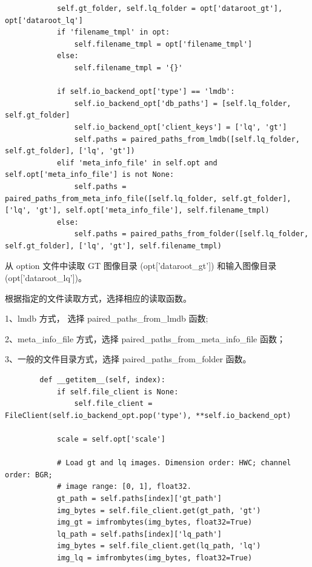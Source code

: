 \documentclass[../main.tex]{subfiles}
\begin{document}
\begin{verbatim}
            self.gt_folder, self.lq_folder = opt['dataroot_gt'], opt['dataroot_lq']
            if 'filename_tmpl' in opt:
                self.filename_tmpl = opt['filename_tmpl']
            else:
                self.filename_tmpl = '{}'

            if self.io_backend_opt['type'] == 'lmdb':
                self.io_backend_opt['db_paths'] = [self.lq_folder, self.gt_folder]
                self.io_backend_opt['client_keys'] = ['lq', 'gt']
                self.paths = paired_paths_from_lmdb([self.lq_folder, self.gt_folder], ['lq', 'gt'])
            elif 'meta_info_file' in self.opt and self.opt['meta_info_file'] is not None:
                self.paths = paired_paths_from_meta_info_file([self.lq_folder, self.gt_folder], ['lq', 'gt'], self.opt['meta_info_file'], self.filename_tmpl)
            else:
                self.paths = paired_paths_from_folder([self.lq_folder, self.gt_folder], ['lq', 'gt'], self.filename_tmpl)
    \end{verbatim}

从 option 文件中读取 GT 图像目录 (opt['dataroot\_gt']) 和输入图像目录 (opt['dataroot\_lq'])。

根据指定的文件读取方式，选择相应的读取函数。

1、lmdb 方式， 选择 paired\_paths\_from\_lmdb 函数;

2、meta\_info\_file 方式，选择 paired\_paths\_from\_meta\_info\_file 函数；

3、一般的文件目录方式，选择 paired\_paths\_from\_folder 函数。

\begin{verbatim}
        def __getitem__(self, index):
            if self.file_client is None:
                self.file_client = FileClient(self.io_backend_opt.pop('type'), **self.io_backend_opt)

            scale = self.opt['scale']

            # Load gt and lq images. Dimension order: HWC; channel order: BGR;
            # image range: [0, 1], float32.
            gt_path = self.paths[index]['gt_path']
            img_bytes = self.file_client.get(gt_path, 'gt')
            img_gt = imfrombytes(img_bytes, float32=True)
            lq_path = self.paths[index]['lq_path']
            img_bytes = self.file_client.get(lq_path, 'lq')
            img_lq = imfrombytes(img_bytes, float32=True)
    \end{verbatim}
\end{document}

